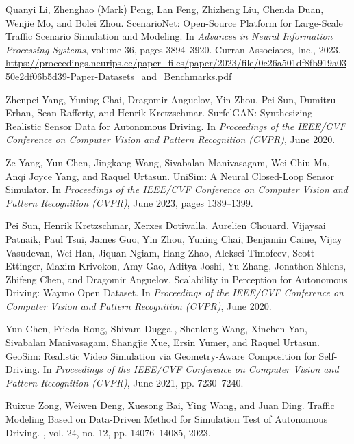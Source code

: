 \documentclass[lettersize,journal]{IEEEtran}
\begin{document}
\begin{thebibliography}{1}
Quanyi Li, Zhenghao (Mark) Peng, Lan Feng, Zhizheng Liu, Chenda Duan, Wenjie Mo, and Bolei Zhou.
\newblock ScenarioNet: Open-Source Platform for Large-Scale Traffic Scenario Simulation and Modeling.
\newblock In {\em Advances in Neural Information Processing Systems}, volume 36, pages 3894--3920. Curran Associates, Inc., 2023.
\newblock \url{https://proceedings.neurips.cc/paper_files/paper/2023/file/0c26a501df8fb919a0350e2df06b5d39-Paper-Datasets_and_Benchmarks.pdf}

Zhenpei Yang, Yuning Chai, Dragomir Anguelov, Yin Zhou, Pei Sun, Dumitru Erhan, Sean Rafferty, and Henrik Kretzschmar.
\newblock SurfelGAN: Synthesizing Realistic Sensor Data for Autonomous Driving.
\newblock In {\em Proceedings of the IEEE/CVF Conference on Computer Vision and Pattern Recognition (CVPR)}, June 2020.

Ze Yang, Yun Chen, Jingkang Wang, Sivabalan Manivasagam, Wei-Chiu Ma, Anqi Joyce Yang, and Raquel Urtasun.
\newblock UniSim: A Neural Closed-Loop Sensor Simulator.
\newblock In {\em Proceedings of the IEEE/CVF Conference on Computer Vision and Pattern Recognition (CVPR)}, June 2023, pages 1389--1399.

Pei Sun, Henrik Kretzschmar, Xerxes Dotiwalla, Aurelien Chouard, Vijaysai Patnaik, Paul Tsui, James Guo, Yin Zhou, Yuning Chai, Benjamin Caine, Vijay Vasudevan, Wei Han, Jiquan Ngiam, Hang Zhao, Aleksei Timofeev, Scott Ettinger, Maxim Krivokon, Amy Gao, Aditya Joshi, Yu Zhang, Jonathon Shlens, Zhifeng Chen, and Dragomir Anguelov.
\newblock Scalability in Perception for Autonomous Driving: Waymo Open Dataset.
\newblock In {\em Proceedings of the IEEE/CVF Conference on Computer Vision and Pattern Recognition (CVPR)}, June 2020.

Yun Chen, Frieda Rong, Shivam Duggal, Shenlong Wang, Xinchen Yan, Sivabalan Manivasagam, Shangjie Xue, Ersin Yumer, and Raquel Urtasun.
\newblock GeoSim: Realistic Video Simulation via Geometry-Aware Composition for Self-Driving.
\newblock In {\em Proceedings of the IEEE/CVF Conference on Computer Vision and Pattern Recognition (CVPR)}, June 2021, pp. 7230--7240.

Ruixue Zong, Weiwen Deng, Xuesong Bai, Ying Wang, and Juan Ding.
\newblock Traffic Modeling Based on Data-Driven Method for Simulation Test of Autonomous Driving.
, vol. 24, no. 12, pp. 14076--14085, 2023.


\end{thebibliography}
\end{document}
